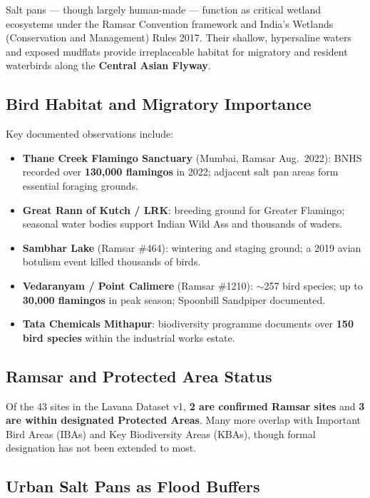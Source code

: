 \documentclass[12pt,a4paper]{article}
\begin{document}
Salt pans — though largely human-made — function as critical wetland ecosystems under
the Ramsar Convention framework and India's Wetlands (Conservation and Management)
Rules 2017. Their shallow, hypersaline waters and exposed mudflats provide irreplaceable
habitat for migratory and resident waterbirds along the \textbf{Central Asian Flyway}.

\subsection{Bird Habitat and Migratory Importance}

Key documented observations include:
\begin{itemize}[leftmargin=*]
  \item \textbf{Thane Creek Flamingo Sanctuary} (Mumbai, Ramsar Aug.\ 2022): BNHS
        recorded over \textbf{130,000 flamingos} in 2022; adjacent salt pan areas
        form essential foraging grounds.
  \item \textbf{Great Rann of Kutch / LRK}: breeding ground for Greater Flamingo;
        seasonal water bodies support Indian Wild Ass and thousands of waders.
  \item \textbf{Sambhar Lake} (Ramsar \#464): wintering and staging ground; a 2019
        avian botulism event killed thousands of birds.
  \item \textbf{Vedaranyam / Point Calimere} (Ramsar \#1210): $\sim$257 bird species;
        up to \textbf{30,000 flamingos} in peak season; Spoonbill Sandpiper documented.
  \item \textbf{Tata Chemicals Mithapur}: biodiversity programme documents over
        \textbf{150 bird species} within the industrial works estate.
\end{itemize}

\subsection{Ramsar and Protected Area Status}

Of the 43 sites in the Lavana Dataset v1, \textbf{2 are confirmed Ramsar sites} and
\textbf{3 are within designated Protected Areas}. Many more overlap with Important
Bird Areas (IBAs) and Key Biodiversity Areas (KBAs), though formal designation has
not been extended to most.

\subsection{Urban Salt Pans as Flood Buffers}
\end{document}
